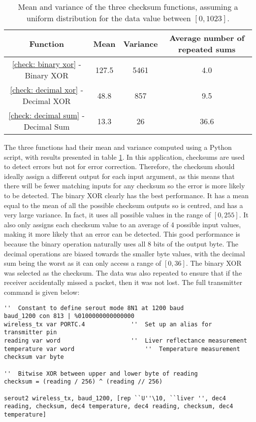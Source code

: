 \begin{table}[htbp]
	\begin{center}
	\caption{Mean and variance of the three checksum functions, assuming a uniform distribution for the data value between $[0,1023]$.}
	\label{tab: checksums}
	\begin{tabular}{|c|c|c|c|}
		\hline
		\textbf{Function} & \textbf{Mean} & \textbf{Variance} & \textbf{Average number of repeated sums}\\
		\hline
		\ref{check: binary xor} - Binary XOR & 127.5 & 5461 & 4.0\\
		\ref{check: decimal xor} - Decimal XOR & 48.8 & 857 & 9.5\\
		\ref{check: decimal sum} - Decimal Sum & 13.3 & 26 & 36.6\\
		\hline
	\end{tabular}
	\end{center}
\end{table}
The three functions had their mean and variance computed using a Python script, with results presented in table \ref{tab: checksums}. In this application, checksums are used to detect errors but not for error correction. Therefore, the checksum should ideally assign a different output for each input argument, as this means that there will be fewer matching inputs for any checksum so the error is more likely to be detected. The binary XOR clearly has the best performance. It has a mean equal to the mean of all the possible checksum outputs so is centred, and has a very large variance. In fact, it uses all possible values in the range of $[0,255]$. It also only assigns each checksum value to an average of 4 possible input values, making it more likely that an error can be detected. This good performance is because the binary operation naturally uses all 8 bits of the output byte. The decimal operations are biased towards the smaller byte values, with the decimal sum being the worst as it can only access a range of $[0,36]$. The binary XOR was selected as the checksum. The data was also repeated to ensure that if the receiver accidentally missed a packet, then it was not lost. The full transmitter command is given below:\\

\begin{lstlisting}
''  Constant to define serout mode 8N1 at 1200 baud
baud_1200 con 813 | %0100000000000000
wireless_tx var PORTC.4				''  Set up an alias for transmitter pin
reading var word 					''  Liver reflectance measurement
temperature var word					''  Temperature measurement
checksum var byte

''  Bitwise XOR between upper and lower byte of reading
checksum = (reading / 256) ^ (reading // 256)

serout2 wireless_tx, baud_1200, [rep ``U''\10, ``liver '', dec4 reading, checksum, dec4 temperature, dec4 reading, checksum, dec4 temperature]
\end{lstlisting}


